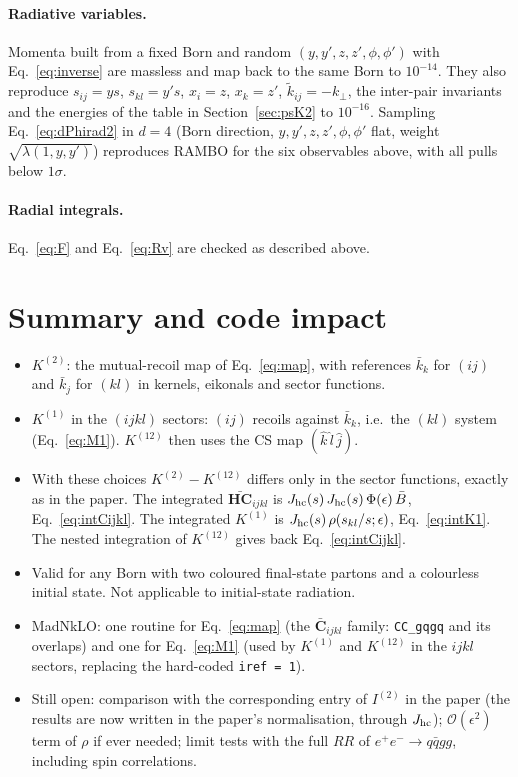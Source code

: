\documentclass[11pt,a4paper]{article}
\newcommand{\bbC}[1]{\bar{\mathbf C}_{#1}}
\newcommand{\bbHC}[1]{\bar{\mathbf{HC}}_{#1}}
\newcommand{\RR}{RR}
\newcommand{\jb}{\bar k_{j}}
\newcommand{\kb}{\bar k_{k}}
\newcommand{\eps}{\epsilon}
\begin{document}
\paragraph{Radiative variables.} Momenta built from a fixed Born and random $(y,y',z,z',\phi,\phi')$ with Eq.~\eqref{eq:inverse}
are massless and map back to the same Born to $10^{-14}$. They also reproduce $s_{ij}=ys$, $s_{kl}=y's$, $x_i=z$, $x_k=z'$, $\tilde k_{ij}=-k_\perp$,
the inter-pair invariants and the energies of the table in Section~\ref{sec:psK2} to $10^{-16}$. Sampling Eq.~\eqref{eq:dPhirad2} in $d=4$
(Born direction, $y,y',z,z',\phi,\phi'$ flat, weight $\sqrt{\lambda(1,y,y')}$) reproduces RAMBO for the six observables above, with all pulls below $1\sigma$.

\paragraph{Radial integrals.} Eq.~\eqref{eq:F} and Eq.~\eqref{eq:Rv} are checked as described above.

\section{Summary and code impact}
\begin{itemize}
\item $K^{(2)}$: the mutual-recoil map of Eq.~\eqref{eq:map}, with references $\kb$ for $(ij)$ and $\jb$ for $(kl)$
in kernels, eikonals and sector functions.
\item $K^{(1)}$ in the $(ijkl)$ sectors: $(ij)$ recoils against $\kb$, i.e.\ the $(kl)$ system
(Eq.~\eqref{eq:M1}). $K^{(12)}$ then uses the CS map $(\hat k\,\hat l\,\hat j)$.
\item With these choices $K^{(2)}-K^{(12)}$ differs only in the sector functions, exactly as in the paper.
The integrated $\bbHC{ijkl}$ is $J_{\rm hc}(s)\,J_{\rm hc}(s)\,\Phi(\eps)\,\bar B$, Eq.~\eqref{eq:intCijkl}.
The integrated $K^{(1)}$ is $J_{\rm hc}(s)\,\rho(s_{kl}/s;\eps)$, Eq.~\eqref{eq:intK1}. The nested integration of $K^{(12)}$ gives back
Eq.~\eqref{eq:intCijkl}.
\item Valid for any Born with two coloured final-state partons and a colourless initial state.
Not applicable to initial-state radiation.
\item MadNkLO: one routine for Eq.~\eqref{eq:map} (the $\bbC{ijkl}$ family: \texttt{CC\_gqgq} and its overlaps) and one for
Eq.~\eqref{eq:M1} (used by $K^{(1)}$ and $K^{(12)}$ in the $ijkl$ sectors, replacing the hard-coded \texttt{iref = 1}).
\item Still open: comparison with the corresponding entry of $I^{(2)}$ in the paper (the results are now written in the paper's normalisation, through $J_{\rm hc}$);
$\mathcal O(\eps^2)$ term of $\rho$ if ever needed;
limit tests with the full $\RR$ of $e^+e^-\to q\bar qgg$, including spin correlations.
\end{itemize}
\end{document}

